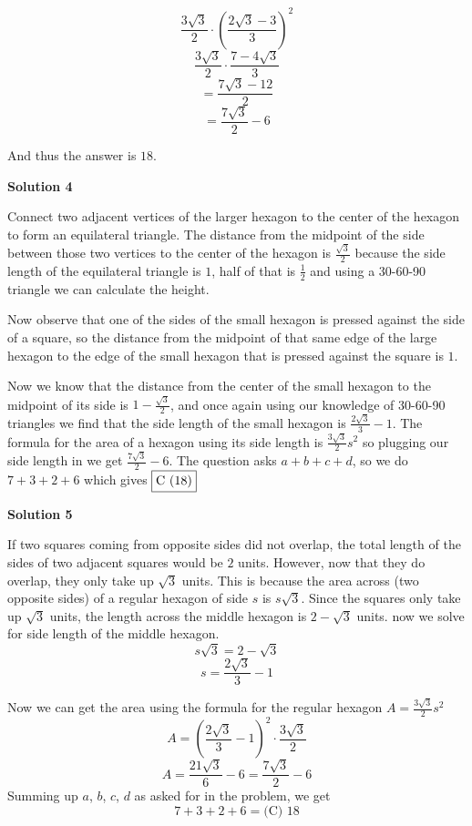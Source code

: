\begin{enumerate}
 
 \[\frac{3\sqrt{3}}{2} \cdot (\frac{2\sqrt{3}-3}{3})^2\]
 \[\frac{3\sqrt{3}}{2} \cdot \frac{7 -4\sqrt{3}}{3}\]
 \[= \frac{7\sqrt{3} - 12}{2}\]
 \[= \frac{7\sqrt{3}}{2} - 6\]

 And thus the answer is $\boxed{18}$.

 



\textbf{Solution 4}

Connect two adjacent vertices of the larger hexagon to the center of the hexagon to form an equilateral triangle. The distance from the midpoint of the side between those two vertices to the center of the hexagon is $\frac{\sqrt{3}}{2}$ because the side length of the equilateral triangle is $1$, half of that is $\frac{1}{2}$ and using a 30-60-90 triangle we can calculate the height. 

 Now observe that one of the sides of the small hexagon is pressed against the side of a square, so the distance from the midpoint of that same edge of the large hexagon to the edge of the small hexagon that is pressed against the square is $1$. 

 Now we know that the distance from the center of the small hexagon to the midpoint of its side is $1-\frac{\sqrt{3}}{2}$, and once again using our knowledge of 30-60-90 triangles we find that the side length of the small hexagon is $\frac{2\sqrt{3}}{3}-1$. The formula for the area of a hexagon using its side length is $\frac{3\sqrt{3}}{2}s^2$ so plugging our side length in we get $\frac{7\sqrt{3}}{2}-6$. The question asks $a+b+c+d$, so we do $7+3+2+6$ which gives $\fbox{C (18)}$




\textbf{Solution 5}

If two squares coming from opposite sides did not overlap, the total length of the sides of two adjacent squares would be $2$ units. However, now that they do overlap, they only take up $\sqrt{3}$ units. This is because the area across (two opposite sides) of a regular hexagon of side $s$ is $s\sqrt{3}$. Since the squares only take up $\sqrt{3}$ units, the length across the middle hexagon is $2-\sqrt{3}$ units. now we solve for side length of the middle hexagon.
 \[s\sqrt{3}=2-\sqrt{3}\]
 \[s=\frac{2\sqrt{3}}{3}-1\]

 Now we can get the area using the formula for the regular hexagon $A=\frac{3\sqrt{3}}{2}s^2$
 \[A=\left(\frac{2\sqrt{3}}{3}-1 \right)^2 \cdot \frac{3\sqrt{3}}{2}\]
 \[A=\frac{21\sqrt{3}}{6}-6=\frac{7\sqrt{3}}{2}-6\]Summing up $a$, $b$, $c$, $d$ as asked for in the problem, we get
 \[7+3+2+6=\boxed{ \text{(C) } 18}\]





\end{enumerate}
